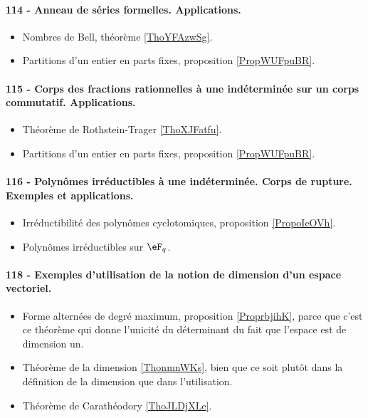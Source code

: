 \paragraph{114 - Anneau de séries formelles. Applications.}
\begin{itemize}
    \item Nombres de Bell, théorème \ref{ThoYFAzwSg}.
    \item Partitions d'un entier en parts fixes, proposition \ref{PropWUFpuBR}.
\end{itemize}

\paragraph{115 - Corps des fractions rationnelles à une indéterminée sur un corps commutatif. Applications.}
\begin{itemize}
    \item Théorème de Rothstein-Trager \ref{ThoXJFatfu}.
    \item Partitions d'un entier en parts fixes, proposition \ref{PropWUFpuBR}.
\end{itemize}

\paragraph{116 - Polynômes irréductibles à une indéterminée. Corps de rupture. Exemples et applications.}
\begin{itemize}
    \item Irréductibilité des polynômes cyclotomiques, proposition \ref{PropoIeOVh}.
    \item Polynômes irréductibles sur \( \eF_q\).
\end{itemize}
\paragraph{118 - Exemples d’utilisation de la notion de dimension d’un espace vectoriel.}
\begin{itemize}
    \item Forme alternées de degré maximum, proposition \ref{ProprbjihK}, parce que c'est ce théorème qui donne l'unicité du déterminant du fait que l'espace est de dimension un.
    \item Théorème de la dimension \ref{ThonmnWKs}, bien que ce soit plutôt dans la définition de la dimension que dans l'utilisation.
    \item Théorème de Carathéodory \ref{ThoJLDjXLe}.
\end{itemize}

